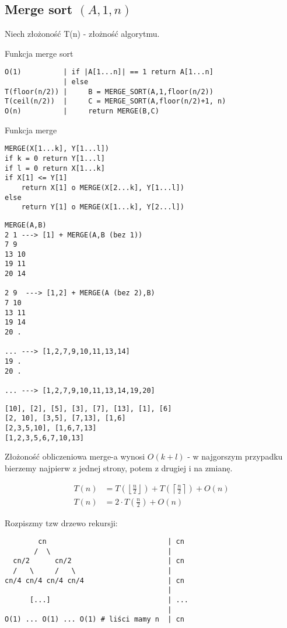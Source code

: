 \documentclass{article}
\begin{document}
\subsection{Merge sort $(A,1,n)$}

Niech złożoność T(n) - złożność algorytmu.

\noindent
Funkcja merge sort
\begin{verbatim}
O(1)          | if |A[1...n]| == 1 return A[1...n]
              | else
T(floor(n/2)) |     B = MERGE_SORT(A,1,floor(n/2))
T(ceil(n/2))  |     C = MERGE_SORT(A,floor(n/2)+1, n)
O(n)          |     return MERGE(B,C)
\end{verbatim}

\noindent
Funkcja merge
\begin{verbatim}
MERGE(X[1...k], Y[1...l])
if k = 0 return Y[1...l]
if l = 0 return X[1...k]
if X[1] <= Y[1]
    return X[1] o MERGE(X[2...k], Y[1...l])
else   
    return Y[1] o MERGE(X[1...k], Y[2...l])
\end{verbatim}

\begin{verbatim}
MERGE(A,B)
2 1 ---> [1] + MERGE(A,B (bez 1))
7 9
13 10
19 11
20 14
  
2 9  ---> [1,2] + MERGE(A (bez 2),B)
7 10
13 11
19 14
20 .

... ---> [1,2,7,9,10,11,13,14]
19 .
20 .

... ---> [1,2,7,9,10,11,13,14,19,20]
\end{verbatim}

\begin{verbatim}
[10], [2], [5], [3], [7], [13], [1], [6]
[2, 10], [3,5], [7,13], [1,6]
[2,3,5,10], [1,6,7,13]
[1,2,3,5,6,7,10,13]
\end{verbatim}

\noindent
Złożoność obliczeniowa merge-a wynosi $O(k+l)$ - w najgorszym przypadku bierzemy najpierw z jednej strony, potem z drugiej i na zmianę.

\begin{align}
    T(n) &= T\left(\left\lfloor \frac{n}{2} \right\rfloor\right) + T\left(\left\lceil \frac{n}{2} \right\rceil\right) + O(n)\\
    T(n) &= 2\cdot T\left(\frac{n}{2}\right) + O(n)
\end{align}

\newpage

\noindent
Rozpiszmy tzw drzewo rekursji:

\begin{verbatim}
        cn                             | cn
       /  \                            |
  cn/2      cn/2                       | cn
  /   \     /   \                      |
cn/4 cn/4 cn/4 cn/4                    | cn
                                       |
      [...]                            | ...
                                       |
O(1) ... O(1) ... O(1) # liści mamy n  | cn
\end{verbatim}
\end{document}
